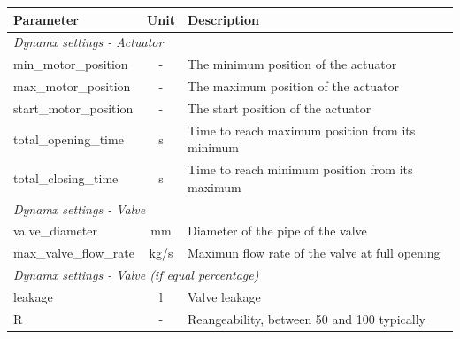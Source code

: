 \documentclass[we,final,11pt,oneside,openany]{uantwerpenbamathesis}
\begin{document}
\begin{table}[h!]
\centering
\begin{tabular}{|lcl|}
\hline
\multicolumn{1}{|l|}{\textbf{Parameter}}     & \multicolumn{1}{c|}{\textbf{Unit}} & \textbf{Description}                                     \\ \hline
\multicolumn{3}{|l|}{\textit{Dynamx settings - Actuator}}                                                                                    \\ \hline
\multicolumn{1}{|l|}{min\_motor\_position}   & \multicolumn{1}{c|}{-}             & The minimum position of the actuator                     \\ \hline
\multicolumn{1}{|l|}{max\_motor\_position}   & \multicolumn{1}{c|}{-}             & The maximum position of the actuator                     \\ \hline
\multicolumn{1}{|l|}{start\_motor\_position} & \multicolumn{1}{c|}{-}             & The start position of the actuator                       \\ \hline
\multicolumn{1}{|l|}{total\_opening\_time}   & \multicolumn{1}{c|}{s}             & Time to reach maximum position from its minimum          \\ \hline
\multicolumn{1}{|l|}{total\_closing\_time}   & \multicolumn{1}{c|}{s}             & Time to reach minimum position from its maximum          \\ \hline
\multicolumn{3}{|l|}{\textit{Dynamx settings - Valve}}                                                                                       \\ \hline
\multicolumn{1}{|l|}{valve\_diameter}        & \multicolumn{1}{c|}{mm}            & Diameter of the pipe of the valve                        \\ \hline
\multicolumn{1}{|l|}{max\_valve\_flow\_rate} & \multicolumn{1}{c|}{kg/s}          & Maximun flow rate of the valve at full opening           \\ \hline
\multicolumn{3}{|l|}{\textit{Dynamx settings - Valve (if equal percentage)}}                                                                 \\ \hline
\multicolumn{1}{|l|}{leakage}                & \multicolumn{1}{c|}{l}             & Valve leakage                                            \\ \hline
\multicolumn{1}{|l|}{R}                      & \multicolumn{1}{c|}{-}             & Reangeability, between 50 and 100 typically              \\ \hline

\end{tabular}
\end{table}
\end{document}
